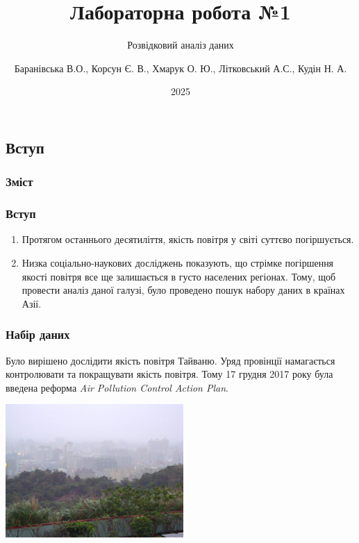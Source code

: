 \documentclass{beamer}
\title{Лабораторна робота №1}
\subtitle{Розвідковий аналіз даних}
\author[]{
  Баранівська В.О.,
  Корсун Є. В.,
  Хмарук О. Ю.,
  Літковський А.С.,
  Кудін Н. А.
}
\date{2025}
\begin{document}
\frame{\titlepage}

\graphicspath{{../../../}}

\begin{frame}
  \section{Вступ}

  \frametitle{Зміст}
  \tableofcontents[currentsection]
\end{frame}

\begin{frame}
  \frametitle{Вступ}

  \begin{enumerate}
    \item Протягом останнього десятиліття, якість повітря у світі суттєво погіршується.

    \item Низка соціально-наукових досліджень показують, що стрімке погіршення якості повітря
    все ще залишається в густо населених регіонах. Тому, щоб провести аналіз даної галузі,
    було проведено пошук набору даних в країнах Азії.

  \end{enumerate}
\end{frame}

\begin{frame}
  \frametitle{Набір даних}

  Було вирішено дослідити якість повітря Тайваню. Уряд провінції намагається
  контролювати та покращувати якість повітря. Тому 17 грудня 2017 року була введена
  реформа \textit{Air Pollution Control Action Plan}.

  \begin{center}
    \includegraphics[height=2in]{notes/media/air_pollution.jpg}
  \end{center}
\end{frame}
\end{document}
